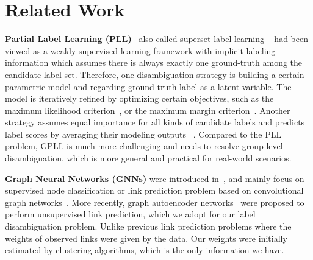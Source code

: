 \documentclass[letterpaper]{article} \usepackage{aaai20}  \usepackage{times}  \usepackage{helvet} \usepackage{courier}  \usepackage[hyphens]{url}  \usepackage{graphicx} \urlstyle{rm} \def\UrlFont{\rm}  \frenchspacing  \setlength{\pdfpagewidth}{8.5in}  \setlength{\pdfpageheight}{11in}  \frenchspacing
\begin{document}
\section{Related Work}


\noindent\textbf{Partial Label Learning (PLL)}~\cite{nguyen2008classification,cour2011PL,xie2018partial} also called superset label learning ~\cite{gong2017regularization} had been viewed as a weakly-supervised learning framework with implicit labeling information which assumes there is always exactly one ground-truth among the candidate label set. Therefore, one disambiguation strategy is building a certain parametric model and regarding ground-truth label as a latent variable. The model is iteratively refined by optimizing certain objectives, such as the maximum likelihood criterion~\cite{kupfer2019valuable,liu2014learnability}, or the maximum margin criterion~\cite{yu2016maximum}. 
Another strategy assumes equal importance for all kinds of candidate labels and predicts label scores by averaging their modeling outputs ~\cite{cour2011PL,tang2017confidence,wu2018towards,wang2019adaptive,xu2019partial}. Compared to the PLL problem, GPLL is much more challenging and needs to resolve group-level disambiguation, which is more general and practical for real-world scenarios.



\noindent\textbf{Graph Neural Networks (GNNs)} were introduced in~\cite{gori2005new,scarselli2008graph}, and mainly focus on supervised node classification or link prediction problem based on convolutional graph networks~\cite{defferrard2016convolutional,kipf2016semi,kipf2016variational,zhang2018link}. More recently, graph autoencoder networks~\cite{berg2017graph} were proposed to perform unsupervised link prediction, which we adopt for our label disambiguation problem. Unlike previous link prediction problems where the weights of observed links were given by the data. Our weights were initially estimated by clustering algorithms, which is the only information we have. 


\iffalse
\begin{figure} [!th]
  \begin{center}
    \texttt{[image: 1632out.png]}
  \end{center}
\caption{Example prediction output of the GPLL problem with the reference to Figure~\ref{fig:EX} (bottom). }
  \label{fig:out}
\end{figure}
\fi
\end{document}
